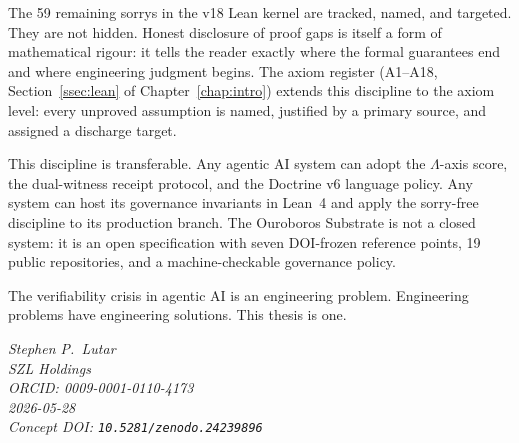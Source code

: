 \medskip

The 59 remaining sorrys in the v18 Lean kernel are tracked, named, and
targeted.
They are not hidden.
Honest disclosure of proof gaps is itself a form of mathematical rigour:
it tells the reader exactly where the formal guarantees end and where
engineering judgment begins.
The axiom register (A1--A18, Section~\ref{ssec:lean} of
Chapter~\ref{chap:intro}) extends this discipline to the axiom level:
every unproved assumption is named, justified by a primary source, and
assigned a discharge target.

\medskip

This discipline is transferable.
Any agentic AI system can adopt the \(\Lambda\)-axis score, the
dual-witness receipt protocol, and the Doctrine v6 language policy.
Any system can host its governance invariants in Lean~4 and apply the
sorry-free discipline to its production branch.
The Ouroboros Substrate is not a closed system: it is an open
specification with seven DOI-frozen reference points, 19 public
repositories, and a machine-checkable governance policy.

\medskip

The verifiability crisis in agentic AI is an engineering problem.
Engineering problems have engineering solutions.
This thesis is one.

\bigskip

\begin{flushright}
\itshape
Stephen P.\ Lutar\\
SZL Holdings\\
ORCID: 0009-0001-0110-4173\\
2026-05-28\\
Concept DOI: \texttt{10.5281/zenodo.24239896}
\end{flushright}
